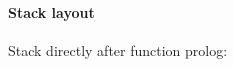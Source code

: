 \begin{itemize}
%
%
\end{itemize}

\paragraph{Stack layout}

Stack directly after function prolog:\\

